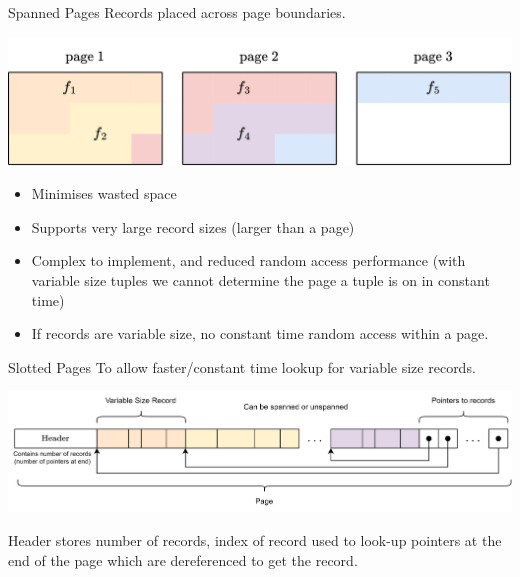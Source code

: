 \begin{definitionbox}{Spanned Pages}
    Records placed across page boundaries.
    \begin{center}
        \includegraphics[width=.8\textwidth]{storage/images/spanned_page.drawio.png}
    \end{center}
    \begin{itemize}
        \item Minimises wasted space
        \item Supports very large record sizes (larger than a page)
        \item Complex to implement, and reduced random access performance (with variable size tuples we cannot determine the page a tuple is on in constant time)
        \item If records are variable size, no constant time random access within a page.
    \end{itemize}
\end{definitionbox}

\begin{definitionbox}{Slotted Pages}
    To allow faster/constant time lookup for variable size records.
    \begin{center}
        \includegraphics[width=.8\textwidth]{storage/images/slotted_pages.drawio.png}
    \end{center}
    Header stores number of records, index of record used to look-up pointers at the end of the page which are dereferenced to get the record.
\end{definitionbox}

